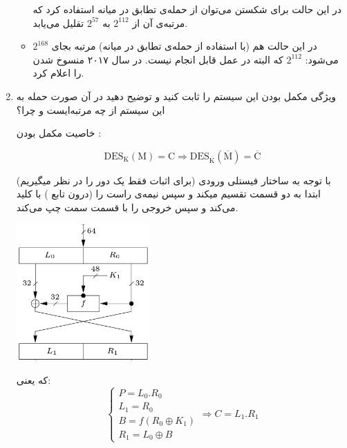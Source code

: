 \documentclass[dvipsnames, svgnames, x11names]{article}
\begin{document}
\begin{enumerate}[label=\alph*)]
\begin{itemize}
در این حالت برای شکستن می‌توان از حمله‌ی تطابق در میانه استفاده کرد که مرتبه‌ی آن از 
$2^{112}$
به
$2^{57}$ 
تقلیل می‌یابد.

\item {}

در این حالت هم (با استفاده از حمله‌ی تطابق در میانه) مرتبه بجای 
$2^{168}$
می‌شود:
$2^{112}$ که البته در عمل قابل انجام نیست. در سال ۲۰۱۷ 
منسوخ شدن
را اعلام کرد.

\end{itemize}
\item 
ویژگی مکمل بودن این سیستم را ثابت کنید و توضیح دهید در آن صورت حمله به
این سیستم از چه مرتبه‌ایست و چرا؟

خاصیت مکمل بودن 
:
\begin{latin}
\begin{equation}
\text{DES}_\text{K}(\text{M}) = \text{C}
\Rightarrow
\text{DES}_{\overline{\text{K}}}(\overline{\text{M}}) = \overline{\text{C}}
\end{equation}
\end{latin}

(برای اثبات فقط یک دور را در نظر میگیریم) با توجه به ساختار فیستلی 
ورودی ابتدا به دو قسمت تقسیم میکند و سپس نیمه‌ی راست را (درون تابع ) با کلید 
می‌کند و سپس خروجی را با قسمت سمت چپ 
می‌کند.
\begin{center}
\includegraphics[width=0.4\textwidth, height=0.35\textheight]{des-feistel}
\end{center}
که یعنی:
\begin{equation}
\begin{cases}
P = L_0.R_0\\
L_1 = R_0 \\
B = f(R_0 \oplus K_1) \\
R_1 = L_0 \oplus B
\end{cases}
\Rightarrow C = L_1.R_1
\end{equation}


\end{enumerate}
\end{document}
